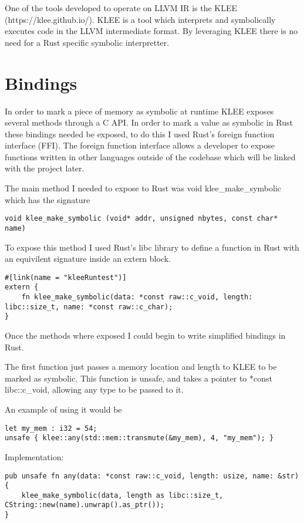 \documentclass{report}
\begin{document}
One of the tools developed to operate on LLVM IR is the KLEE (https://klee.github.io/). KLEE is a tool which interprets and symbolically executes code in the LLVM intermediate format. By leveraging KLEE there is no need for a Rust specific symbolic interpretter.

\chapter {Bindings}

In order to mark a piece of memory as symbolic at runtime KLEE exposes several methods through a C API. In order to mark a value as symbolic in Rust these bindings needed be exposed, to do this I used Rust's foreign function interface (FFI). The foreign function interface allows a developer to expose functions written in other languages outside of the codebase which will be linked with the project later.

The main method I needed to expose to Rust was void klee_make_symbolic which has the signature
\begin{lstlisting}
void klee_make_symbolic	(void* addr, unsigned nbytes, const char* name)
\end{lstlisting}

To expose this method I used Rust's libc library to define a function in Rust with an equivilent signature inside an extern block.

\begin{lstlisting}
#[link(name = "kleeRuntest")]
extern {
    fn klee_make_symbolic(data: *const raw::c_void, length: libc::size_t, name: *const raw::c_char);
}
\end{lstlisting}

Once the methods where exposed I could begin to write simplified bindings in Rust.

The first function just passes a memory location and length to KLEE to be marked as symbolic. This function is unsafe, and takes a pointer to *const libc::c_void, allowing any type to be passed to it.

An example of using it would be
\begin {lstlisting}
let my_mem : i32 = 54;
unsafe { klee::any(std::mem::transmute(&my_mem), 4, "my_mem"); }
\end{lstlisting}

Implementation:
\begin {lstlisting}
pub unsafe fn any(data: *const raw::c_void, length: usize, name: &str) {
    klee_make_symbolic(data, length as libc::size_t, CString::new(name).unwrap().as_ptr());
}
\end{lstlisting}
\end{document}
